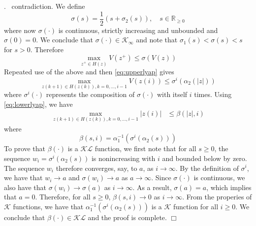 \documentclass{article}
\newenvironment{proof}{\noindent {\em Proof}.\ }{\hspace*{\fill}$\Box$\medskip\\}
\newcommand{\abs}[1]{\left\lvert #1 \right\rvert}
\begin{document}
\begin{proof}
contradiction. We define
\begin{equation*}
\sigma(s) = \frac{1}{2}(s+\sigma_2(s)), \quad s \in \mathbb{R}_{\geq 0}
\end{equation*}
where now $\sigma(\cdot)$ is continuous, strictly increasing and unbounded and $\sigma(0) = 0$.
We conclude that $\sigma(\cdot) \in \mathcal{K}_\infty$ and note that $\sigma_1(s) < \sigma(s) < s$ for 
$s > 0$. Therefore
\begin{equation*}
\max_{z^+ \in H(z)} V(z^+) \leq \sigma(V(z))
\end{equation*}
Repeated use of the above and then \eqref{eq:upperlyap} gives
\begin{equation*}
\max_{z(k+1) \in H(z(k)),k=0,\dots,i-1} V(z(i)) \leq \sigma^i(\alpha_2(\abs{z}))
\end{equation*}
where $\sigma^i(\cdot)$ represents the composition of $\sigma(\cdot)$ with itself $i$ times. 
Using \eqref{eq:lowerlyap}, we have
\begin{align*}
\max_{z(k+1) \in H(z(k)),k=0,\dots,i-1} \abs{z(i)} %
&\leq \beta(\abs{z},i)
\end{align*}
where
\begin{equation*}
\beta(s,i) = \alpha_1^{-1}(\sigma^i(\alpha_2(s)))
\end{equation*}
To prove that $\beta(\cdot)$ is a $\mathcal{KL}$ function, we first note that for all $s \geq 0$, the sequence 
$w_i = \sigma^i(\alpha_2(s))$ is nonincreasing with $i$ and bounded below by zero. The sequence $w_i$ therefore 
converges, say, to $a$, as $i \rightarrow \infty$. By the definition of $\sigma^i$, we have that $w_i \rightarrow
a$ and $\sigma(w_i) \rightarrow a$ as $a \rightarrow \infty$. Since $\sigma(\cdot)$ is continuous, we also have 
that $\sigma(w_i) \rightarrow \sigma(a)$ as $i \rightarrow \infty$. As a result, $\sigma(a) = a$, which implies 
that $a = 0$. Therefore, for all $s \geq 0$, $\beta(s,i) \rightarrow 0$ as $i \rightarrow \infty$. From the
properies of $\mathcal{K}$ functions, we have that $\alpha_1^{-1}(\sigma^i(\alpha_2(s)))$ is a
$\mathcal{K}$ function for all $i \geq 0$. We conclude that $\beta(\cdot) \in \mathcal{KL}$ and the proof is
complete.
\end{proof}




\end{document}
